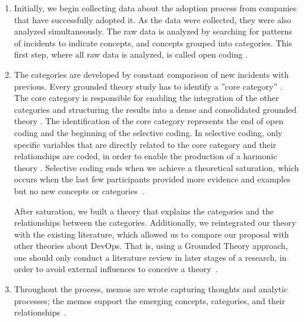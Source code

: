 \begin{enumerate}[label=(\Alph*)]

\item Initially, we begin collecting data about the adoption
process from companies that have successfully adopted
it. As the data were collected, they were also analyzed
simultaneously. The raw data is analyzed by searching for
patterns of incidents to indicate concepts, and concepts
grouped into categories. This first step, where all raw data
is analyzed, is called open coding \cite{stol2016grounded}.

\item The categories are developed by constant comparison
of new incidents with previous. Every grounded theory
study has to identify a ”core category” \cite{stol2016grounded}. The core
category is responsible for enabling the integration of the
other categories and structuring the results into a dense
and consolidated grounded theory \cite{jantunen_using_gt_approach}. The identification
of the core category represents the end of open coding
and the beginning of the selective coding. In selective
coding, only specific variables that are directly related
to the core category and their relationships are coded, in
order to enable the production of a harmonic theory \cite{using_gt_coleman,hoda_impact_inadequate}.
Selective coding ends when we achieve a theoretical saturation, which
occurs when the last few participants provided more evidence and examples but
no new concepts or categories~\cite{glaser1967discovery}.

After saturation, we built a theory that explains the categories and the
relationships between the categories. Additionally, we reintegrated our theory
with the existing literature, which allowed us to compare our proposal with
other theories about DevOps. That is, using a Grounded Theory approach, one
should only conduct a literature review in later stages of a research, in order
to avoid external influences to conceive a theory~\cite{reconciling_perspectives}.

\item Throughout the process, memos are wrote capturing
thoughts and analytic processes; the memos support the
emerging concepts, categories, and their relationships~\cite{reconciling_perspectives}.

\end{enumerate}

